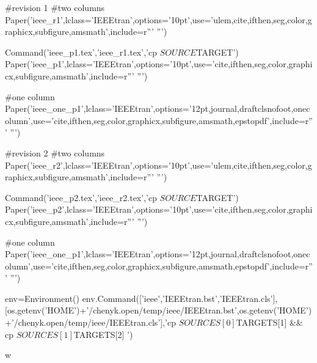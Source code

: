 \begin{itemize}[leftmargin=2em, label={\textbf{·}}]
#revision 1
#two columns
Paper('ieee_r1',lclass='IEEEtran',options='10pt',use='ulem,cite,ifthen,seg,color,graphicx,subfigure,amsmath',include=r'''
\DeclareRobustCommand{\old}[1]{\color{blue}{\sout{#1}}\color{black}{}}
\DeclareRobustCommand{\new}[1]{\color{red}{\textit{#1}}\color{black}{}} 
''')

Command('ieee_p1.tex','ieee_r1.tex','cp $SOURCE $TARGET')
Paper('ieee_p1',lclass='IEEEtran',options='10pt',use='cite,ifthen,seg,color,graphicx,subfigure,amsmath',include=r'''
\DeclareRobustCommand{\old}[1]{}
\DeclareRobustCommand{\new}[1]{#1}
''')

#one column
Paper('ieee_one_p1',lclass='IEEEtran',options='12pt,journal,draftclsnofoot,onecolumn',use='cite,ifthen,seg,color,graphicx,subfigure,amsmath,epstopdf',include=r'''
\DeclareRobustCommand{\old}[1]{}
\DeclareRobustCommand{\new}[1]{#1}
\DeclareRobustCommand{\dlo}[1]{}
\DeclareRobustCommand{\wen}[1]{#1}
''')


#revision 2
#two columns
Paper('ieee_r2',lclass='IEEEtran',options='10pt',use='ulem,cite,ifthen,seg,color,graphicx,subfigure,amsmath',include=r'''
\DeclareRobustCommand{\dlo}[1]{}
\DeclareRobustCommand{\wen}[1]{#1}
\DeclareRobustCommand{\old}[1]{\color{blue}{\sout{#1}}\color{black}{}}
\DeclareRobustCommand{\new}[1]{\color{red}{\textit{#1}}\color{black}{}} 
''')

Command('ieee_p2.tex','ieee_r2.tex','cp $SOURCE $TARGET')
Paper('ieee_p2',lclass='IEEEtran',options='10pt',use='cite,ifthen,seg,color,graphicx,subfigure,amsmath',include=r'''
\DeclareRobustCommand{\dlo}[1]{}
\DeclareRobustCommand{\wen}[1]{#1}
\DeclareRobustCommand{\old}[1]{}
\DeclareRobustCommand{\new}[1]{#1}
''')

#one column
Paper('ieee_one_p1',lclass='IEEEtran',options='12pt,journal,draftclsnofoot,onecolumn',use='cite,ifthen,seg,color,graphicx,subfigure,amsmath,epstopdf',include=r'''
\DeclareRobustCommand{\old}[1]{}
\DeclareRobustCommand{\new}[1]{#1}
\DeclareRobustCommand{\dlo}[1]{}
\DeclareRobustCommand{\wen}[1]{#1}
''')

env=Environment()
env.Command(['ieee','IEEEtran.bst','IEEEtran.cls'],[os.getenv('HOME')+'/chenyk.open/temp/ieee/IEEEtran.bst',os.getenv('HOME')+'/chenyk.open/temp/ieee/IEEEtran.cls'],'cp  ${SOURCES[0]}  ${TARGETS[1]} && cp  ${SOURCES[1]}  ${TARGETS[2]} ')




w



\end{itemize}
